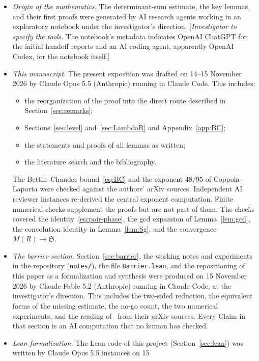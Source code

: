 \documentclass[11pt]{amsart}
\theoremstyle{definition}
\theoremstyle{remark}
\numberwithin{equation}{section}
\begin{document}
\begin{itemize}
\item \emph{Origin of the mathematics.}  The determinant-sum estimate, the
key lemmas, and their first proofs were generated by AI research agents
working in an exploratory notebook under the investigator's direction.
[\emph{Investigator to specify the tools.}  The notebook's metadata indicates
OpenAI ChatGPT for the initial handoff reports and an AI coding agent,
apparently OpenAI Codex, for the notebook itself.]
\item \emph{This manuscript.}  The present exposition was drafted on
14--15 November 2026 by Claude Opus 5.5 (Anthropic) running in Claude Code.
This includes:
\begin{itemize}
\item the reorganization of the proof into the direct route described in
Section~\ref{sec:remarks};
\item Sections~\ref{sec:level} and~\ref{sec:LambdaR} and
Appendix~\ref{app:BC};
\item the statements and proofs of all lemmas as written;
\item the literature search and the bibliography.
\end{itemize}
The Bettin--Chandee bound~\eqref{eq:BC} and the exponent $48/95$ of
Coppola--Laporta were checked against the authors' arXiv sources.
Independent AI reviewer instances re-derived the central exponent
computation.  Finite numerical checks supplement the proofs but are not
part of them.  The checks covered the identity~\eqref{eq:pair-phase}, the
gcd expansion of Lemma~\ref{lem:gcd}, the convolution identity in
Lemma~\ref{lem:Sg}, and the convergence $M(R)\to\mathfrak S$.
\item \emph{The barrier section.}  Section~\ref{sec:barrier}, the working
notes and experiments in the repository (\texttt{notes/}), the file
\texttt{Barrier.lean}, and the repositioning of this paper as a
formalization and synthesis were produced on 15 November 2026 by Claude
Fable 5.2 (Anthropic) running in Claude Code, at the investigator's
direction.  This includes the two-sided reduction, the equivalent forms of
the missing estimate, the no-go count, the two numerical experiments, and
the reading of~\cite{BBLR,Polymath8a,FKM3,But,May2,Pas25,GM24,GM25,Lau} from
their arXiv sources.  Every Claim in that section is an AI computation that
no human has checked.
\item \emph{Lean formalization.}  The Lean code of this project
(Section~\ref{sec:lean}) was written by Claude Opus 5.5 instances on 15

\end{itemize}
\end{document}

